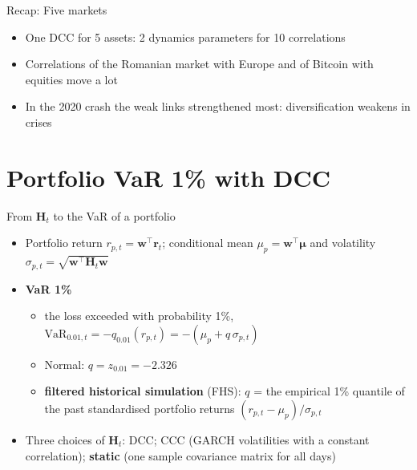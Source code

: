 \begin{frame}{Recap: Five markets}
\itemsize{\small}
\begin{itemize}
    \item One DCC for 5 assets: 2 dynamics parameters for 10 correlations
    \item Correlations of the Romanian market with Europe and of Bitcoin with equities move a lot
    \item In the 2020 crash the weak links strengthened most: diversification weakens in crises
\end{itemize}
\end{frame}


\section{Portfolio VaR 1\% with DCC}

\begin{frame}{From $\mathbf{H}_t$ to the VaR of a portfolio}
\itemsize{\small}
\begin{itemize}
    \item Portfolio return $r_{p,t} = \mathbf{w}^\top\mathbf{r}_t$; conditional mean $\mu_p = \mathbf{w}^\top\boldsymbol{\mu}$ and volatility $\sigma_{p,t} = \sqrt{\mathbf{w}^\top\mathbf{H}_t\mathbf{w}}$
    \item \textbf{VaR 1\%}
    \begin{itemize}
        \item the loss exceeded with probability 1\%, $\mathrm{VaR}_{0.01,t} = -q_{0.01}(r_{p,t}) = -(\mu_p + q\,\sigma_{p,t})$
        \item Normal: $q = z_{0.01} = -2.326$
        \item \textbf{filtered historical simulation} (FHS): $q$ = the empirical 1\% quantile of the past standardised portfolio returns $(r_{p,t} - \mu_p)/\sigma_{p,t}$
    \end{itemize}
    \item Three choices of $\mathbf{H}_t$: DCC; CCC (GARCH volatilities with a constant correlation); \textbf{static} (one sample covariance matrix for all days)
\end{itemize}
\end{frame}

